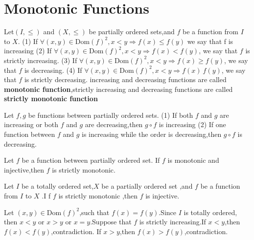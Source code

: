 \documentclass{book}
\begin{document}
\section{Monotonic Functions}
\begin{definitionenv}
    Let$(I,\le)$ and $(X,\le)$ be partially ordered sets,and $f$ be a function from $I$
 to $X$.
 \newline
 (1) If $\forall(x,y)\in \mathrm{Dom}(f)^2,x<y \Rightarrow f(x)\le f(y)$ we say that f is increasing 
 \newline
 (2) If $\forall (x,y)\in \mathrm{Dom}(f)^2,x<y \Rightarrow f(x)< f(y)$, we say that $f$ is strictly increasing.
 \newline
  (3) If $\forall (x,y)\in \mathrm{Dom}(f)^2,x<y \Rightarrow f(x)\geq  f(y)$, we say that $f$ is decreasing.
\newline
 (4) If $\forall (x,y)\in \mathrm{Dom}(f)^2,x<y \Rightarrow f(x)\> f(y)$, we say that $f$ is strictly decreasing.
 \newline
increasing and decreasing functions are called \textbf{monotonic function},strictly increasing and decreasing functions are called \textbf{strictly monotonic function}
\end{definitionenv}
\begin{propositionenv}
    Let $f,g$ be functions between partially ordered sets.
    \newline
    (1) If both $f$ and $g$ are increasing or both $f$ and $g$ are decreasing,then $g\circ f $ is increasing
    \newline
    (2) If one function between $f$ and $g$ is increasing while the order is decreasing,then $g\circ f $ is decreasing.
\end{propositionenv}
\begin{propositionenv}
    Let $f$ be a function between partially ordered set. If $f$ is monotonic and injective,then $f$ is strictly monotonic.
\end{propositionenv}
\begin{propositionenv}
    Let $I$ be a totally ordered set,$X$ be a partially ordered set ,and $f$ be a function from $I$ to $X$ .I f $f$ is strictly monotonic
    ,then $f$ is injective.
\end{propositionenv}
\begin{proofenv}
    Let $(x,y)\in \mathrm{Dom}(f)^2$,such that $f(x)=f(y)$.Since $I$ is totally ordered, then $x<y$ or $x>y$ or $x=y$.Suppose that $f$ is strictly increasing.If $x<y $,then $f(x)<f(y)$,contradiction. If $x>y $,then $f(x)>f(y)$,contradiction.
\end{proofenv}
\end{document}
